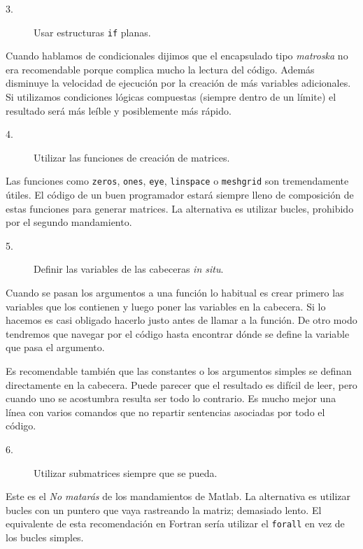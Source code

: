 \begin{description}
\item [3.]Usar estructuras \texttt{if} planas.
\end{description}
Cuando hablamos de condicionales dijimos que el encapsulado tipo
\emph{matroska} no era recomendable porque complica mucho la lectura
del código. Además disminuye la velocidad de ejecución por la creación
de más variables adicionales. Si utilizamos condiciones lógicas
compuestas (siempre dentro de un límite) el resultado será más leíble
y posiblemente más rápido.

\begin{description}
\item [4.]Utilizar las funciones de creación de matrices.
\end{description}
Las funciones como \texttt{zeros}, \texttt{ones}, \texttt{eye},
\texttt{linspace} o \texttt{meshgrid} son tremendamente útiles. El
código de un buen programador estará siempre lleno de composición de
estas funciones para generar matrices. La alternativa es utilizar
bucles, prohibido por el segundo mandamiento.

\begin{description}
\item [5.]Definir las variables de las cabeceras \emph{in situ}.
\end{description}
Cuando se pasan los argumentos a una función lo habitual es crear
primero las variables que los contienen y luego poner las variables en
la cabecera. Si lo hacemos es casi obligado hacerlo justo antes de
llamar a la función. De otro modo tendremos que navegar por el código
hasta encontrar dónde se define la variable que pasa el argumento.

Es recomendable también que las constantes o los argumentos simples se
definan directamente en la cabecera. Puede parecer que el resultado es
difícil de leer, pero cuando uno se acostumbra resulta ser todo lo
contrario. Es mucho mejor una línea con varios comandos que no
repartir sentencias asociadas por todo el código.

\begin{description}
\item [6.]Utilizar submatrices siempre que se pueda.
\end{description}
Este es el \emph{No matarás} de los mandamientos de Matlab. La
alternativa es utilizar bucles con un puntero que vaya rastreando la
matriz; demasiado lento. El equivalente de esta recomendación en
Fortran sería utilizar el \texttt{forall} en vez de los bucles
simples.

